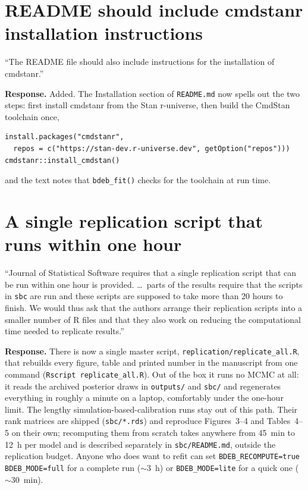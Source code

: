 \documentclass[11pt,a4paper]{article}
\newcommand{\code}[1]{\texttt{#1}}
\newcommand{\pkg}[1]{\textsf{#1}}
\begin{document}
\section{README should include cmdstanr installation instructions}

\begin{displayquote}
``The README file should also include instructions for the installation
of cmdstanr.''
\end{displayquote}

\textbf{Response.} Added. The Installation section of \code{README.md}
now spells out the two steps: first install \pkg{cmdstanr} from the Stan
r-universe, then build the CmdStan toolchain once,
\begin{Verbatim}[fontsize=\small]
install.packages("cmdstanr",
  repos = c("https://stan-dev.r-universe.dev", getOption("repos")))
cmdstanr::install_cmdstan()
\end{Verbatim}
\noindent and the text notes that \code{bdeb\_fit()} checks for the
toolchain at run time.

\section{A single replication script that runs within one hour}

\begin{displayquote}
``Journal of Statistical Software requires that a single replication
script that can be run within one hour is provided. \ldots\ parts of the
results require that the scripts in \code{sbc} are run and these scripts
are supposed to take more than 20 hours to finish. We would thus ask
that the authors arrange their replication scripts into a smaller number
of R files and that they also work on reducing the computational time
needed to replicate results.''
\end{displayquote}

\textbf{Response.} There is now a single master script,
\code{replication/replicate\_all.R}, that rebuilds every figure, table
and printed number in the manuscript from one command
(\verb|Rscript replicate_all.R|). Out of the box it runs no MCMC at all:
it reads the archived posterior draws in \code{outputs/} and \code{sbc/}
and regenerates everything in roughly a minute on a laptop, comfortably
under the one-hour limit. The lengthy simulation-based-calibration runs
stay out of this path. Their rank matrices are shipped
(\code{sbc/*.rds}) and reproduce Figures~3--4 and Tables~4--5 on their
own; recomputing them from scratch takes anywhere from 45~min to 12~h per
model and is described separately in \code{sbc/README.md}, outside the
replication budget. Anyone who does want to refit can set
\code{BDEB\_RECOMPUTE=true BDEB\_MODE=full} for a complete run
($\sim$3~h) or \code{BDEB\_MODE=lite} for a quick one ($\sim$30~min).
\end{document}
